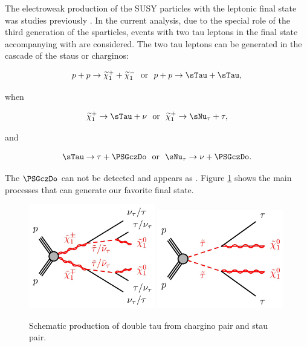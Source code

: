 The electroweak production of the SUSY particles with the leptonic final state was studies previously \cite{CMS-PAS-SUS-13-006}.
In the current analysis, due to the special role of the third generation of the sparticles, events with two tau leptons in the final state 
accompanying with \MET are considered.
The two tau leptons can be generated in the cascade of the staus or charginos:
\begin{linenomath}
\begin{equation}
p + p \rightarrow \PSGcpDo +\PSGcmDo ~~\mathrm{or}~~  p + p \rightarrow \sTau + \sTau,
\end{equation}
\end{linenomath}
when 
\begin{linenomath}
\begin{equation}
\PSGcpDo \rightarrow \sTau + \nu ~~\mathrm{or}~~  \PSGcpDo \rightarrow \sNu_{\tau} + \tau,
\end{equation}
\end{linenomath}
and 
\begin{linenomath}
\begin{equation}
\sTau \rightarrow \tau + \PSGczDo ~~\mathrm{or}~~  \sNu_{\tau} \rightarrow \nu + \PSGczDo.
\end{equation}
\end{linenomath}
The $\PSGczDo$ can not be detected and appears as \MET.
Figure \ref{fig:Productions} shows the main processes that can generate our favorite final state.
\begin{figure}[!Hhtb]
\centering
\includegraphics[width=0.49\textwidth]{Introductionfigs/DiChargino.png}
\includegraphics[width=0.49\textwidth]{Introductionfigs/DiSTau.png}
\caption{Schematic production of double tau from chargino pair and stau pair.}
\label{fig:Productions}
\end{figure}
